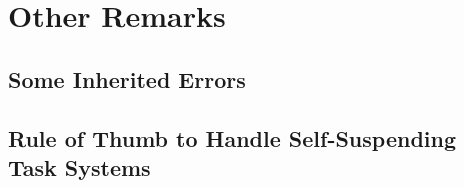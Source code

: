 \section{Other Remarks}

\subsection{Some Inherited Errors}





\subsection{Rule of Thumb to Handle Self-Suspending Task Systems}





  